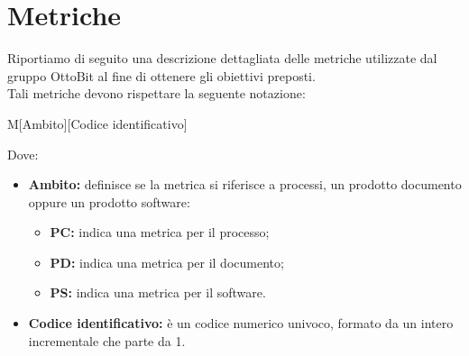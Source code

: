 \section{Metriche}
Riportiamo di seguito una descrizione dettagliata delle metriche utilizzate dal gruppo OttoBit al fine di ottenere gli obiettivi preposti. \\
Tali metriche devono rispettare la seguente notazione: 
	\begin{center}
		M[Ambito][Codice identificativo]
	\end{center}
	Dove:
	\begin{itemize}
		\item \textbf{Ambito:} definisce se la metrica si riferisce a processi, un prodotto documento oppure un prodotto software:
		\begin{itemize}
			\item \textbf{PC:} indica una metrica per il processo;
			\item \textbf{PD:} indica una metrica per il documento;
			\item \textbf{PS:} indica una metrica per il software.
		\end{itemize}
		\item \textbf{Codice identificativo:} è un codice numerico univoco, formato da un intero incrementale che parte da 1.
	\end{itemize}
	
